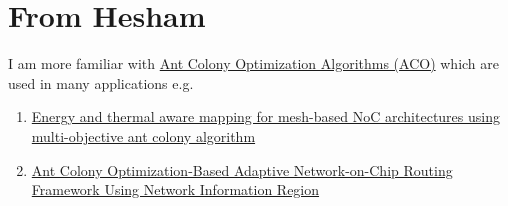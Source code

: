 \documentclass[../../../OAE-SPEC-MAIN.tex]{subfiles}
\begin{document}
\section{From Hesham}

I am more familiar with \href{https://ieeexplore.ieee.org/abstract/document/5764225}{Ant Colony Optimization Algorithms (ACO)} which are used in many applications e.g. 

\begin{enumerate}
\item  \href{https://ieeexplore.ieee.org/document/6945251}{Energy and thermal aware mapping for mesh-based NoC architectures using multi-objective ant colony algorithm}

\item  \href{ (https://ieeexplore.ieee.org/document/6945251)}{ Ant Colony Optimization-Based Adaptive Network-on-Chip Routing Framework Using Network Information Region}
\end{enumerate}
\end{document}
